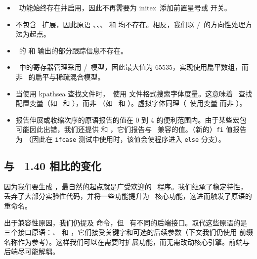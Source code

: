 \begin{itemize}\item \ETEX\ 功能始终存在并启用，因此不再需要为 initex\ 添加前置星号或  开关。

\item 不包含 \TEXXET\ 扩展，因此原语 \type {\TeXXeTstate}、\type {\beginR}、\type {\beginL}、\type {\endR} 和 \type {\endL} 均不存在。相反，我们以 \OMEGA/\ALEPH\ 的方向性处理方法为起点。

\item \ETEX\ 的  和  输出的部分跟踪信息不存在。

\item \LUATEX\ 中的寄存器管理采用 \OMEGA/\ALEPH\ 模型，因此最大值为 65535，实现使用扁平数组，而非 \ETEX\ 的扁平与稀疏混合模型。

\item 当使用 kpathsea 查找文件时，\LUATEX\ 使用  文件格式搜索字体度量。这意味着 \LUATEX\ 查找  配置变量（如 \OMEGA\ 和 \ALEPH），而非 （如 \TEX\ 和 \PDFTEX）。虚拟字体同理（\LUATEX\ 使用变量  而非 ）。

\item 报告伸展或收缩次序的原语报告的值在 0 到 4 的便利范围内。由于某些宏包可能因此出错，我们还提供 \type {\eTeXgluestretchorder} 和 \type {\eTeXglueshrinkorder}，它们报告与 \ETEX\ 兼容的值。（新的）\texttt{fi} 值报告为 （因此在 \texttt{ifcase} 测试中使用时，该值会使程序进入 \texttt{else} 分支）。

\end{itemize}

\subsection{与 \PDFTEX\ 1.40 相比的变化}

\topicindex {\PDFTEX}

因为我们要生成 \PDF，最自然的起点就是广受欢迎的 \PDFTEX\ 程序。我们继承了稳定特性，丢弃了大部分实验性代码，并将一些功能提升为 \LUATEX\ 核心功能，这进而触发了原语的重命名。

出于兼容性原因，我们仍提及  命令，但 \LUATEX\ 有不同的后端接口。取代这些原语的是三个接口原语：、 和 ，它们接受关键字和可选的后续参数（下文我们仍使用  前缀名称作为参考）。这样我们可以在需要时扩展功能，而无需改动核心引擎。前端与后端尽可能解耦。

